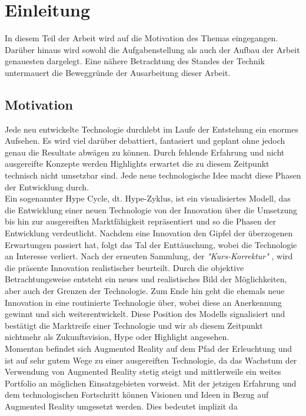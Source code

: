 
\chapter{Einleitung}
In diesem Teil der Arbeit wird auf die Motivation des Themas eingegangen. Darüber hinaus wird sowohl die Aufgabenstellung als auch der 
Aufbau der Arbeit genauesten dargelegt. Eine nähere Betrachtung des Standes der Technik untermauert die Beweggründe der Ausarbeitung 
dieser Arbeit. 
\section{Motivation}
Jede neu entwickelte Technologie durchlebt im Laufe der Entstehung ein enormes Aufsehen. Es wird viel darüber debattiert, fantasiert 
und geplant ohne jedoch genau die Resultate abwägen zu können. Durch fehlende Erfahrung und nicht ausgereifte Konzepte werden Highlights 
erwartet die zu diesem Zeitpunkt technisch nicht umsetzbar sind. Jede neue technologische Idee macht diese Phasen der Entwicklung durch. 
\\ 
\linebreak
Ein sogenannter Hype Cycle, dt. Hype-Zyklus, ist ein visualisiertes Modell, das die Entwicklung einer neuen Technologie von der 
Innovation über die Umsetzung bis hin zur ausgereiften Marktfähigkeit repräsentiert und so die Phasen der Entwicklung verdeutlicht. 
Nachdem eine Innovation den Gipfel der überzogenen Erwartungen passiert hat, folgt das Tal der Enttäuschung, wobei die Technologie 
an Interesse verliert. Nach der erneuten Sammlung, der \textit{"Kurs-Korrektur"} \cite{hypecycle.2019o}, wird die präsente Innovation 
realistischer beurteilt. Durch die objektive Betrachtungsweise entsteht ein neues und realistisches Bild der Möglichkeiten, aber auch 
der Grenzen der Technologie. Zum Ende hin geht die ehemals neue Innovation in eine routinierte Technologie über, wobei diese an 
Anerkennung gewinnt und sich weiterentwickelt. Diese Position des Modells signalisiert und bestätigt die Marktreife einer Technologie 
und wir ab diesem Zeitpunkt nichtmehr als Zukunftsvision, Hype oder Highlight angesehen.
\\ 
\linebreak
Momentan befindet sich Augmented Reality auf dem Pfad der Erleuchtung und ist auf sehr gutem Wege zu einer ausgereiften Technologie, 
da das Wachstum der Verwendung von Augmented Reality stetig steigt und mittlerweile ein weites Portfolio an möglichen Einsatzgebieten 
vorweist. Mit der jetzigen Erfahrung und dem technologischen Fortschritt können Visionen und Ideen in Bezug auf Augmented Reality 
umgesetzt werden.  Dies bedeutet implizit da



